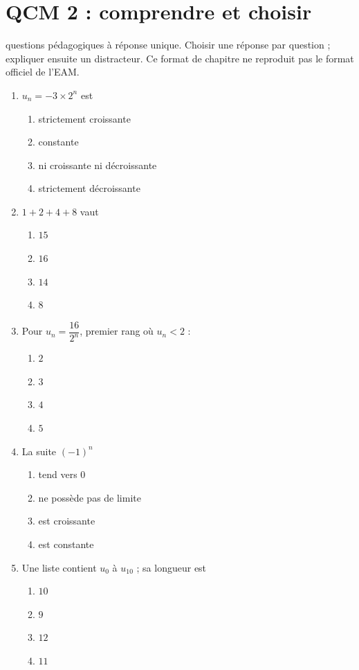 \endgroup
\begingroup\small
{}\section*{QCM 2 : comprendre et choisir}\label{C01-Q2}
 questions pédagogiques à réponse unique. Choisir une réponse par question ; expliquer ensuite un distracteur. Ce format de chapitre ne reproduit pas le format officiel de l’EAM.
\begin{enumerate}
\item $u_n=-3\times2^n$ est
\begin{enumerate}[label=\Alph*.,itemsep=2pt]
\item strictement croissante
\item constante
\item ni croissante ni décroissante
\item strictement décroissante
\end{enumerate}
\item $1+2+4+8$ vaut
\begin{enumerate}[label=\Alph*.,itemsep=2pt]
\item $15$
\item $16$
\item $14$
\item $8$
\end{enumerate}
\item Pour $u_n=\dfrac{16}{2^n}$, premier rang où $u_n<2$ :
\begin{enumerate}[label=\Alph*.,itemsep=2pt]
\item $2$
\item $3$
\item $4$
\item $5$
\end{enumerate}
\item La suite $(-1)^n$
\begin{enumerate}[label=\Alph*.,itemsep=2pt]
\item tend vers 0
\item ne possède pas de limite
\item est croissante
\item est constante
\end{enumerate}
\item Une liste contient $u_0$ à $u_{10}$ ; sa longueur est
\begin{enumerate}[label=\Alph*.,itemsep=2pt]
\item $10$
\item $9$
\item $12$
\item $11$
\end{enumerate}
\end{enumerate}
